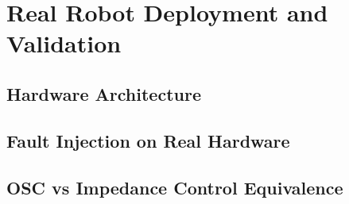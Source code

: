 
\chapter{Real Robot Deployment and Validation}\label{ch:real_robot}

\section{Hardware Architecture}\label{sec:hardware}

%

\section{Fault Injection on Real Hardware}\label{sec:real_fault_injection}

%
%
%
%

\section{OSC vs Impedance Control Equivalence}\label{sec:control_equivalence}

%
%
%

